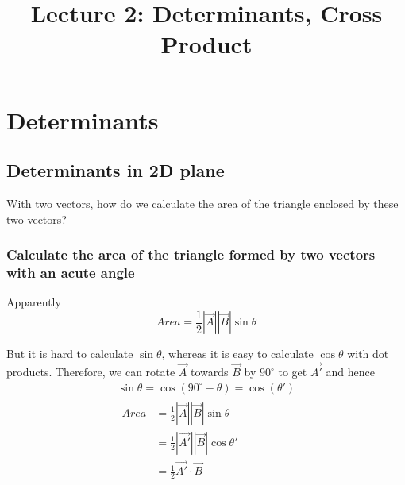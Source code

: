 \documentclass{article}
\title{Lecture 2: Determinants, Cross Product}
\author{}
\date{}
\begin{document}
    
\maketitle

\section{Determinants}

\subsection{Determinants in 2D plane}

With two vectors, how do we calculate the area of the triangle enclosed by
these two vectors?

\subsubsection{Calculate the area of the triangle formed by two vectors with an acute angle}


Apparently
\[
  Area = \frac{1}{2}|\vec{A}||\vec{B}|\sin\theta
\]

But it is hard to calculate $\sin\theta$, whereas it is easy to calculate
$\cos\theta$ with dot products. Therefore, we can rotate $\vec{A}$ towards
$\vec{B}$ by $90^{\circ}$ to get $\vec{A'}$ and hence
\begin{gather*}
  \sin\theta = \cos(90^{\circ} - \theta) = \cos(\theta') \\
  \begin{split}
  Area  &= \frac{1}{2} |\vec{A}| |\vec{B}| \sin\theta \\
        &= \frac{1}{2} |\vec{A'}| |\vec{B}| \cos\theta' \\
        &= \frac{1}{2} \vec{A'} \cdot \vec{B} \\
  \end{split} \\
\end{gather*}
\end{document}
